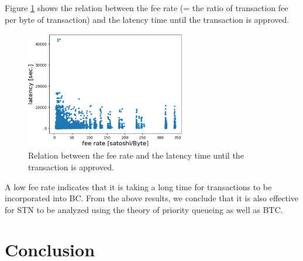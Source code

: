 \documentclass[graybox]{svmult}
\begin{document}
Figure \ref{fig:exp3-3} shows the relation between the fee rate (= the ratio of transaction fee per byte of transaction) and the latency time until the transaction is approved. 
%
\begin{figure}[t]
  \begin{center}
    \includegraphics[width=70mm]{exp3-3.eps}
  \end{center}
  \caption{Relation between the fee rate and the latency time until the transaction is approved.}
  \label{fig:exp3-3}
\end{figure}
%
A low fee rate indicates that it is taking a long time for transactions to be incorporated into BC.
From the above results, we conclude that it is also effective for STN to be analyzed using the theory of priority queueing as well as BTC. 



\section{Conclusion}
\label{sec:conclusion}
\end{document}
